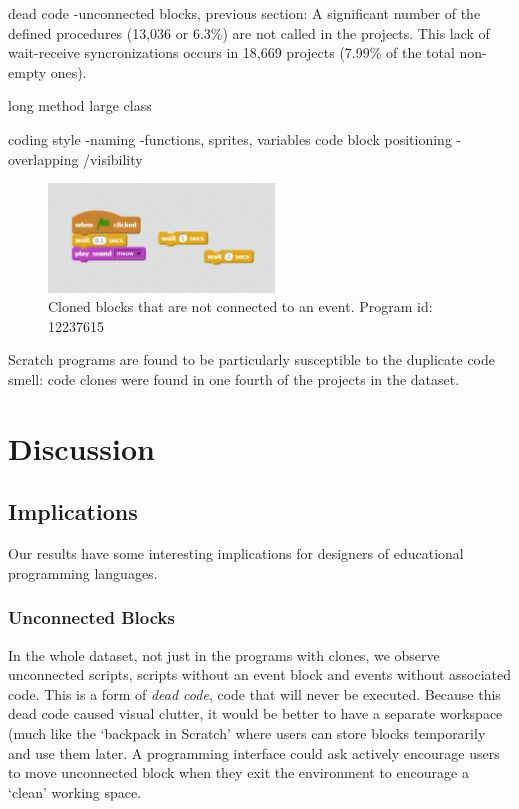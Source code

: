 \documentclass{sig-alternate}
\begin{document}
dead code -unconnected blocks,
previous section: A significant number of the defined procedures (13,036 or 6.3\%) are not called in the projects.
This lack of wait-receive syncronizations occurs in 18,669 projects (7.99\% of the total non-empty ones).

long method
large class


coding style -naming -functions, sprites, variables
code block positioning - overlapping /visibility


\begin{figure}
	\begin{center}
		\includegraphics[width=6cm]{fig/Unconnected_clones.png}
		\caption{Cloned blocks that are not connected to an event. Program id: 12237615}
		\label{fig:Unconnected_clones}
	\end{center}
\end{figure} 



Scratch programs are found to be particularly susceptible to the duplicate code smell: code clones were found in one fourth of the projects in the dataset.


\section{Discussion}

\subsection{Implications}
Our results have some interesting implications for designers of educational programming languages. 

\subsubsection{Unconnected Blocks}
In the whole dataset, not just in the programs with clones, we observe unconnected scripts, scripts without an event block and events without associated code. This is a form of \emph{dead code}, code that will never be executed. Because this dead code caused visual clutter, it would be better to have a separate workspace (much like the `backpack in Scratch' where users can store blocks temporarily and use them later. A programming interface could ask actively encourage users to move unconnected block when they exit the environment to encourage a `clean' working space. 
\end{document}
